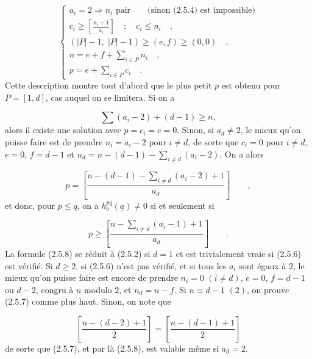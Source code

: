 
\begin{equation}\tag{2.5.5}
\left\{
\begin{array}{l}
a_i = 2 \Longrightarrow n_i \mbox{ pair} \qquad \mbox{(sinon (2.5.4) est impossible)} \\[3mm]
c_i \geq \left[ \displaystyle\frac{n_i+1}{a_i} \right] \quad ; \quad c_i \leq n_i \quad , \\[3mm]
(|P|-1, \; |P|-1) \geq (e,f) \geq (0,0) \quad , \\[3mm]
n = e+f+ \sum_{i\in P} n_i \quad , \\[3mm]
p = e + \sum_{i\in P} c_i \quad .
\end{array}
\right.
\end{equation}
Cette description montre tout d'abord que le plus petit $p$ est obtenu pour $P = [1,d]$, cas auquel on se limitera. Si on a

\begin{equation}\tag{2.5.6}
\sum (a_i-2) + (d-1) \geq n,
\end{equation}
alors il existe une solution avec $p = c_i = e = 0$. Sinon, si $a_d \neq 2$, le mieux qu'on puisse faire est de prendre $n_i = a_i - 2$ pour $i \neq d$, de sorte que $c_i = 0$ pour $i \neq d$, $e = 0$, $f = d-1$ et $n_d = n - (d-1) - \sum\limits_{i \neq d} (a_i-2)$. On a alors

\begin{equation}\tag{2.5.7}
p = \left[ \displaystyle\frac{n-(d-1) - \sum\limits_{i \neq d} (a_i-2) + 1}{a_d} \right] \qquad ,
\end{equation}
et donc, pour $p \leq q$, on a $h^{pq}_{o}(\underline{a}) \neq 0$ si et seulement si

\begin{equation}\tag{2.5.8}
p \geq \left[ \displaystyle\frac{n- \sum\limits_{i \neq d} (a_i-1) + 1}{a_d} \right] \qquad .
\end{equation}
La formule (2.5.8) se réduit à (2.5.2) si $d = 1$ et est trivialement vraie si (2.5.6) est vérifié. Si $d \geq 2$, si (2.5.6) n'est pas vérifié, et si tous les $a_i$ sont égaux à $2$, le mieux qu'on puisse faire est encore de
prendre $n_i = 0$ $(i \neq d)$, $e = 0$, $f = d-1$ ou $d-2$, congru à $n$ modulo $2$, et $n_d = n-f$. Si $n \equiv d-1$ $(2)$, on prouve (2.5.7) comme plus haut. Sinon, on note que

\begin{equation*}
\left[ \displaystyle\frac{n - (d-2) + 1}{2} \right] = \left[ \displaystyle\frac{n - (d-1) + 1}{2} \right]
\end{equation*}
de sorte que (2.5.7), et par là (2.5.8), est valable même si $a_d = 2$.

